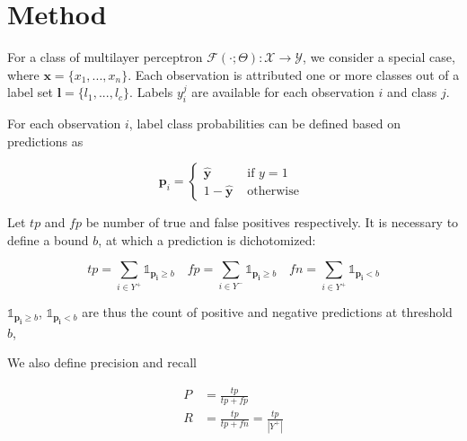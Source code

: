 
\section{Method}
\label{sec:orga8a42f5}


For a class of multilayer perceptron \(\mathcal{F}(\cdot ; \Theta): \mathcal{X} \rightarrow \mathcal{Y}\), we consider a special case, where \(\mathbf{x} = \{x_1, ..., x_n\}\). Each observation is attributed one or more classes out of a label set \(\mathbf{l} = \{l_1, ..., l_c\}\). Labels \(y_{i}^{j}\) are available for each observation \(i\) and class \(j\). 

For each observation \(i\), label class probabilities can be defined based on predictions as


\begin{equation}
\mathbf{p}_{i}=\left\{\begin{array}{ll}\hat{\mathbf{y}} & \text { if } y=1 \\ 1-\hat{\mathbf{y}} & \text { otherwise }\end{array}\right.
\end{equation}

Let \(tp\) and \(fp\) be number of true and false positives respectively. It is necessary to define a bound \(b\), at which a prediction is dichotomized:


\begin{equation}
\label{eq:conf}
 t p=\sum_{i \in Y^{+}} \mathds{1}_{\mathbf{p_i} \geq b} \quad f p=\sum_{i \in Y^{-}} \mathds{1}_{\mathbf{p_i} \geq b} \quad fn = \sum_{i \in Y^{+}} \mathds{1}_{\mathbf{p_i} < b}
\end{equation}

\(\mathds{1}_{\mathbf{p_i} \geq b}\), \(\mathds{1}_{\mathbf{p_i} < b}\) are thus the count of positive and negative predictions at threshold \(b\), 

We also define precision and recall

\begin{equation}
\begin{aligned} P &=\frac{t p}{t p+f p} \\ R &=\frac{t p}{t p+f n}=\frac{t p}{\left|Y^{+}\right|} \end{aligned}
\end{equation}

